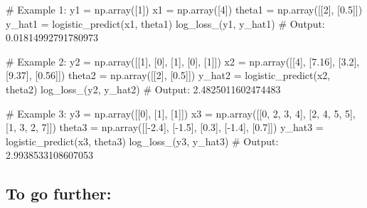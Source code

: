 \documentclass[]{article}
\newenvironment{Shaded}{\begin{snugshade}}{\end{snugshade}}
\newcommand{\CommentTok}[1]{\textcolor[rgb]{0.48,0.49,0.49}{#1}}
\newcommand{\DecValTok}[1]{\textcolor[rgb]{0.96,0.45,0.00}{#1}}
\newcommand{\FloatTok}[1]{\textcolor[rgb]{0.96,0.45,0.00}{#1}}
\newcommand{\NormalTok}[1]{\textcolor[rgb]{0.81,0.81,0.76}{#1}}
\newcommand{\OperatorTok}[1]{\textcolor[rgb]{0.81,0.81,0.76}{#1}}
\begin{document}
\begin{Shaded}
\begin{Highlighting}[]
\CommentTok{# Example 1:}
\NormalTok{y1 }\OperatorTok{=}\NormalTok{ np.array([}\DecValTok{1}\NormalTok{])}
\NormalTok{x1 }\OperatorTok{=}\NormalTok{ np.array([}\DecValTok{4}\NormalTok{])}
\NormalTok{theta1 }\OperatorTok{=}\NormalTok{ np.array([[}\DecValTok{2}\NormalTok{], [}\FloatTok{0.5}\NormalTok{]])}
\NormalTok{y_hat1 }\OperatorTok{=}\NormalTok{ logistic_predict(x1, theta1)}
\NormalTok{log_loss_(y1, y_hat1)}
\CommentTok{# Output:}
\FloatTok{0.01814992791780973}

\CommentTok{# Example 2:}
\NormalTok{y2 }\OperatorTok{=}\NormalTok{ np.array([[}\DecValTok{1}\NormalTok{], [}\DecValTok{0}\NormalTok{], [}\DecValTok{1}\NormalTok{], [}\DecValTok{0}\NormalTok{], [}\DecValTok{1}\NormalTok{]])}
\NormalTok{x2 }\OperatorTok{=}\NormalTok{ np.array([[}\DecValTok{4}\NormalTok{], [}\FloatTok{7.16}\NormalTok{], [}\FloatTok{3.2}\NormalTok{], [}\FloatTok{9.37}\NormalTok{], [}\FloatTok{0.56}\NormalTok{]])}
\NormalTok{theta2 }\OperatorTok{=}\NormalTok{ np.array([[}\DecValTok{2}\NormalTok{], [}\FloatTok{0.5}\NormalTok{]])}
\NormalTok{y_hat2 }\OperatorTok{=}\NormalTok{ logistic_predict(x2, theta2)}
\NormalTok{log_loss_(y2, y_hat2)}
\CommentTok{# Output:}
\FloatTok{2.4825011602474483}

\CommentTok{# Example 3:}
\NormalTok{y3 }\OperatorTok{=}\NormalTok{ np.array([[}\DecValTok{0}\NormalTok{], [}\DecValTok{1}\NormalTok{], [}\DecValTok{1}\NormalTok{]])}
\NormalTok{x3 }\OperatorTok{=}\NormalTok{ np.array([[}\DecValTok{0}\NormalTok{, }\DecValTok{2}\NormalTok{, }\DecValTok{3}\NormalTok{, }\DecValTok{4}\NormalTok{], [}\DecValTok{2}\NormalTok{, }\DecValTok{4}\NormalTok{, }\DecValTok{5}\NormalTok{, }\DecValTok{5}\NormalTok{], [}\DecValTok{1}\NormalTok{, }\DecValTok{3}\NormalTok{, }\DecValTok{2}\NormalTok{, }\DecValTok{7}\NormalTok{]])}
\NormalTok{theta3 }\OperatorTok{=}\NormalTok{ np.array([[}\OperatorTok{-}\FloatTok{2.4}\NormalTok{], [}\OperatorTok{-}\FloatTok{1.5}\NormalTok{], [}\FloatTok{0.3}\NormalTok{], [}\OperatorTok{-}\FloatTok{1.4}\NormalTok{], [}\FloatTok{0.7}\NormalTok{]])}
\NormalTok{y_hat3 }\OperatorTok{=}\NormalTok{ logistic_predict(x3, theta3)}
\NormalTok{log_loss_(y3, y_hat3)}
\CommentTok{# Output:}
\FloatTok{2.9938533108607053}
\end{Highlighting}
\end{Shaded}

\hypertarget{to-go-further-1}{%
\subsection{To go further:}\label{to-go-further-1}}
\end{document}
